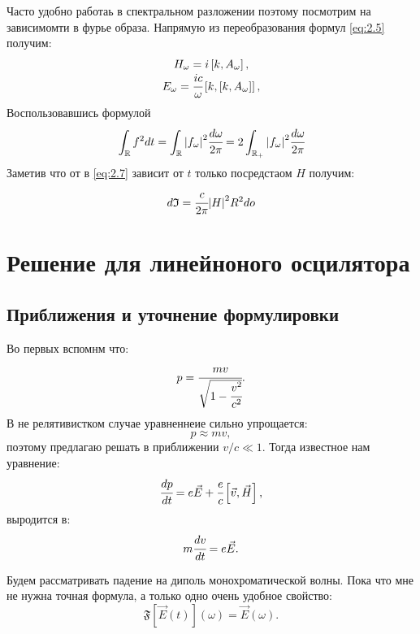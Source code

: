 \documentclass[a4paper]{article}
\newcommand{\insqr}[1]{\left[ #1 \right]}
\newcommand{\re}{\mathbb{R}}
\numberwithin{equation}{section}
\begin{document}
Часто удобно работаь в спектральном разложении поэтому посмотрим 
на зависимомти в фурье образа. Напрямую из переобразования формул 
\ref{eq:2.5} получим:
\begin{gather}
    \begin{matrix}
        H_\omega = i \insqr{k, A_\omega},\\
        E_\omega = \cfrac{ic}{\omega} \insqr{k, \insqr{k, A_\omega}},
    \end{matrix}
\end{gather}
Воспользовавшись формулой 
\begin{equation}
    \int_\re f^2 dt = \int_\re \abs{f_\omega}^2 \cfrac{d\omega}{2\pi} 
    = 2\int_{\re_+} \abs{f_\omega}^2 \cfrac{d\omega}{2\pi} 
\end{equation}
Заметив что от в \ref{eq:2.7}  зависит от $t$ только посредстаом $H$ 
получим:
\begin{equation}
    d\mathfrak{I} = \cfrac{c}{2\pi} \abs{H}^2R^2do
\end{equation}



\section{Решение для линейноного осцилятора}
\subsection{Приближения и уточнение формулировки}
Во первых вспомнм что:
\begin{equation}
    p  = \cfrac{mv}{\sqrt{1 - \cfrac{v^2}{c^2}}}.
\end{equation}
В не релятивистком случае уравненнеие сильно упрощается:
\begin{equation}
    p \approx mv,
\end{equation}
поэтому предлагаю решать в приближении $v/c \ll 1$.
Тогда известное нам уравнение:
\begin{equation}
    \cfrac{dp}{dt} = e \vec E + \cfrac{e}{c} \insqr{\vec v, \vec H},
\end{equation}
выродится в: 
\begin{equation}
    m\cfrac{dv}{dt} = e \vec E.
\end{equation}

Будем рассматривать падение на диполь монохроматической волны. 
Пока что мне не нужна точная формула, а только одно очень 
удобное свойство:
\begin{equation}
    \mathfrak F\insqr{\vec E (t)}(\omega) = \vec E (\omega).
\end{equation}
\end{document}
